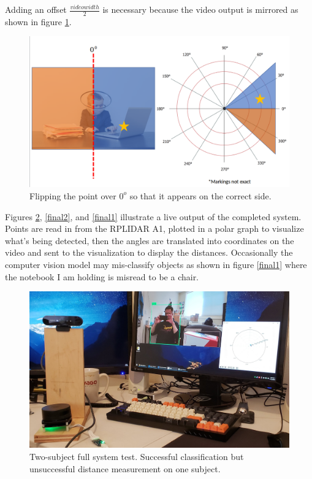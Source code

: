 \documentclass[onecolumn, draftclsnofoot,10pt, compsoc]{IEEEtran}
\makeatletter
\newcommand\captionof[1]{\def\@captype{#1}\caption}
\makeatother
\begin{document}
\begin{singlespace}
		Adding an offset \(\frac{video width}{2}\) is necessary because the video output is mirrored as shown in figure \ref{reverse}.

		\begin{figure}[H]
		\includegraphics[scale=0.4]{reverse.png}
		\captionof{figure}{Flipping the point over \(0^o\) so that it appears on the correct side.}
		\label{reverse}
		\end{figure}

		Figures \ref{final3}, \ref{final2}, and \ref{final1} illustrate a live output of the completed system.
		Points are read in from the RPLIDAR A1, plotted in a polar graph to visualize what's being detected, then the angles are translated into coordinates on the video and sent to the visualization to display the distances.
		Occasionally the computer vision model may mis-classify objects as shown in figure \ref{final1} where the notebook I am holding is misread to be a chair.

		\begin{figure}[H]
		\includegraphics[scale=0.15]{final3.jpg}
		\captionof{figure}{Two-subject full system test. Successful classification but unsuccessful distance measurement on one subject.}
		\label{final3}
		\end{figure}


\end{singlespace}
\end{document}
